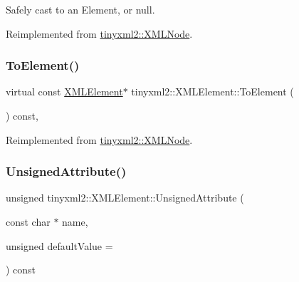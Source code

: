 Safely cast to an Element, or null. 



Reimplemented from \mbox{\hyperlink{classtinyxml2_1_1_x_m_l_node_aab516e699567f75cc9ab2ef2eee501e8}{tinyxml2\+::\+X\+M\+L\+Node}}.

\mbox{\label{classtinyxml2_1_1_x_m_l_element_afeb353047ab8532191709dcaef07337e}} 
\subsubsection{\texorpdfstring{To\+Element()}{ToElement()}\hspace{0.1cm}{\footnotesize\ttfamily [2/2]}}
{\footnotesize\ttfamily virtual const \mbox{\hyperlink{classtinyxml2_1_1_x_m_l_element}{X\+M\+L\+Element}}$\ast$ tinyxml2\+::\+X\+M\+L\+Element\+::\+To\+Element (\begin{DoxyParamCaption}{ }\end{DoxyParamCaption}) const\hspace{0.3cm}{\ttfamily [inline]}, {\ttfamily [virtual]}}



Reimplemented from \mbox{\hyperlink{classtinyxml2_1_1_x_m_l_node_a2c5c843b8f37306f15994ebe882b9346}{tinyxml2\+::\+X\+M\+L\+Node}}.

\mbox{\label{classtinyxml2_1_1_x_m_l_element_afea43a1d4aa33e3703ddee5fc9adc26c}} 
\subsubsection{\texorpdfstring{Unsigned\+Attribute()}{UnsignedAttribute()}}
{\footnotesize\ttfamily unsigned tinyxml2\+::\+X\+M\+L\+Element\+::\+Unsigned\+Attribute (\begin{DoxyParamCaption}\item[{const char $\ast$}]{name,  }\item[{unsigned}]{default\+Value = {} }\end{DoxyParamCaption}) const}



